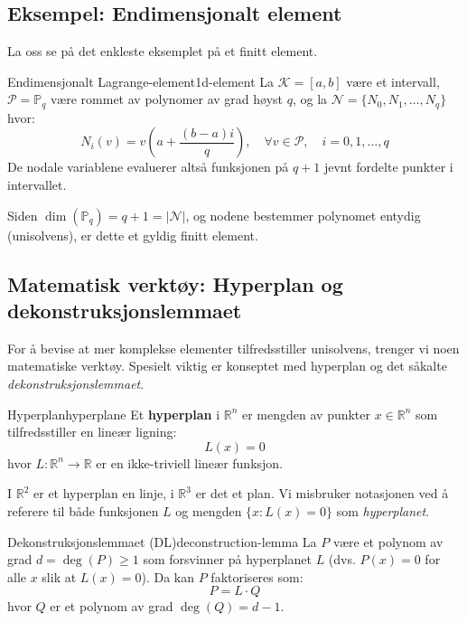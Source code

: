 \documentclass[../../main.tex]{subfiles}
\begin{document}
\subsection{Eksempel: Endimensjonalt element}

La oss se på det enkleste eksemplet på et finitt element.

\begin{example}{Endimensjonalt Lagrange-element}{1d-element}
La $\mathcal{K} = [a, b]$ være et intervall, $\mathcal{P} = \mathbb{P}_q$ være rommet av polynomer av grad høyst $q$, og la $\mathcal{N} = \{N_0, N_1, \ldots, N_q\}$ hvor:
\[
    N_i(v) = v\left(a + \frac{(b - a)i}{q}\right), \quad \forall v \in \mathcal{P}, \quad i = 0, 1, \ldots, q
\]
De nodale variablene evaluerer altså funksjonen på $q+1$ jevnt fordelte punkter i intervallet.

Siden $\dim(\mathbb{P}_q) = q+1 = |\mathcal{N}|$, og nodene bestemmer polynomet entydig (unisolvens), er dette et gyldig finitt element.
\end{example}

\begin{center}
    
\end{center}

\subsection{Matematisk verktøy: Hyperplan og dekonstruksjonslemmaet}

For å bevise at mer komplekse elementer tilfredsstiller unisolvens, trenger vi noen matematiske verktøy. Spesielt viktig er konseptet med hyperplan og det såkalte \emph{dekonstruksjonslemmaet}.

\begin{definition}{Hyperplan}{hyperplane}
Et \textbf{hyperplan} i $\mathbb{R}^n$ er mengden av punkter $x \in \mathbb{R}^n$ som tilfredsstiller en lineær ligning:
\[
    L(x) = 0
\]
hvor $L: \mathbb{R}^n \to \mathbb{R}$ er en ikke-triviell lineær funksjon.
\end{definition}

\begin{remark}{}{}
I $\mathbb{R}^2$ er et hyperplan en linje, i $\mathbb{R}^3$ er det et plan. Vi misbruker notasjonen ved å referere til både funksjonen $L$ og mengden $\{x : L(x) = 0\}$ som \emph{hyperplanet}.
\end{remark}

\begin{lemma}{Dekonstruksjonslemmaet (DL)}{deconstruction-lemma}
La $P$ være et polynom av grad $d = \deg(P) \geq 1$ som forsvinner på hyperplanet $L$ (dvs. $P(x) = 0$ for alle $x$ slik at $L(x) = 0$). Da kan $P$ faktoriseres som:
\[
    P = L \cdot Q
\]
hvor $Q$ er et polynom av grad $\deg(Q) = d - 1$.
\end{lemma}
\end{document}
